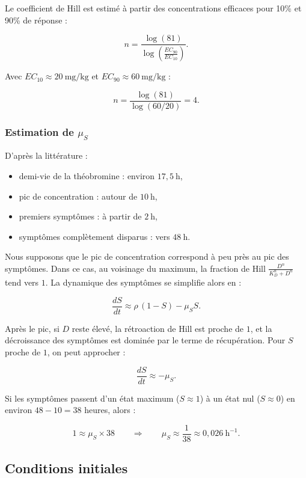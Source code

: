 \documentclass[11pt,a4paper]{article}
\begin{document}
Le coefficient de Hill est estimé à partir des concentrations efficaces
pour 10\% et 90\% de réponse :

\[
n = \frac{\log(81)}{\log\!\left(\frac{EC_{90}}{EC_{10}}\right)}.
\]

Avec \(EC_{10}\approx 20\ \mathrm{mg/kg}\) et
\(EC_{90}\approx 60\ \mathrm{mg/kg}\) :

\[
n
= \frac{\log(81)}{\log(60/20)}
= 4.
\]

\subsubsection{Estimation de \(\mu_S\)}

D'après la littérature :

\begin{itemize}
    \item demi-vie de la théobromine : environ \(17{,}5\ \mathrm{h}\),
    \item pic de concentration : autour de \(10\ \mathrm{h}\),
    \item premiers symptômes : à partir de \(2\ \mathrm{h}\),
    \item symptômes complètement disparus : vers \(48\ \mathrm{h}\).
\end{itemize}

Nous supposons que le pic de concentration correspond à peu près au pic des symptômes.
Dans ce cas, au voisinage du maximum, la fraction de Hill
\(\frac{D^n}{K_D^n + D^n}\)
tend vers \(1\). La dynamique des symptômes se simplifie alors en :

\[
\frac{dS}{dt}
\approx \rho\,(1-S) - \mu_S S.
\]

Après le pic, si \(D\) reste élevé, la rétroaction de Hill est proche de \(1\),
et la décroissance des symptômes est dominée par le terme de récupération.
Pour \(S\) proche de \(1\), on peut approcher :

\[
\frac{dS}{dt} \approx -\mu_S.
\]

Si les symptômes passent d'un état maximum (\(S\approx 1\)) à un état nul
(\(S\approx 0\)) en environ \(48 - 10 = 38\) heures, alors :

\[
1 \approx \mu_S \times 38
\qquad \Rightarrow \qquad
\mu_S \approx \frac{1}{38}
              \approx 0{,}026\ \mathrm{h^{-1}}.
\]


\subsection{Conditions initiales}
\end{document}
